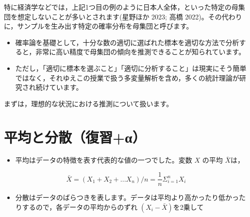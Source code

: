 \documentclass[
  letterpaper,
  DIV=11,
  numbers=noendperiod]{scrreprt}
\providecommand{\tightlist}{%
  \setlength{\itemsep}{0pt}\setlength{\parskip}{0pt}}\usepackage{longtable,booktabs,array}
\begin{document}
\begin{tcolorbox}[enhanced jigsaw, title=\textcolor{quarto-callout-note-color}{\faInfo}\hspace{0.5em}{Note}, colframe=quarto-callout-note-color-frame, bottomrule=.15mm, colback=white, left=2mm, leftrule=.75mm, opacitybacktitle=0.6, breakable, arc=.35mm, rightrule=.15mm, titlerule=0mm, colbacktitle=quarto-callout-note-color!10!white, bottomtitle=1mm, opacityback=0, coltitle=black, toptitle=1mm, toprule=.15mm]

特に経済学などでは，上記1つ目の例のように日本人全体，といった特定の母集団を想定しないことが多いとされます(星野ほか
2023; 高橋
2022)。その代わりに，サンプルを生み出す特定の確率分布を母集団と呼びます。

\end{tcolorbox}

\begin{itemize}
\item
  確率論を基礎として，十分な数の適切に選ばれた標本を適切な方法で分析すると，非常に高い精度で母集団の傾向を推測できることが知られています。
\item
  ただし，「適切に標本を選ぶこと」「適切に分析すること」は現実にそう簡単ではなく，それゆえこの授業で扱う多変量解析を含め，多くの統計理論が研究され続けています。
\end{itemize}

まずは，理想的な状況における推測について扱います。

\hypertarget{ux5e73ux5747ux3068ux5206ux6563ux5fa9ux7fd2ux3b1}{%
\section{平均と分散（復習+α）}\label{ux5e73ux5747ux3068ux5206ux6563ux5fa9ux7fd2ux3b1}}

\begin{itemize}
\tightlist
\item
  平均はデータの特徴を表す代表的な値の一つでした。変数 \(X\) の平均
  \(\bar X\)は，
\end{itemize}

\[ \bar X = (X_1 + X_2 + ... X_n )/n = \frac{1}{n} \Sigma_{i=1}^{n} X_i
\]

\begin{itemize}
\tightlist
\item
  分散はデータのばらつきを表します。データは平均より高かったり低かったりするので，各データの平均からのずれ
  \((X_i - \bar X)\)を2乗して
\end{itemize}
\end{document}
